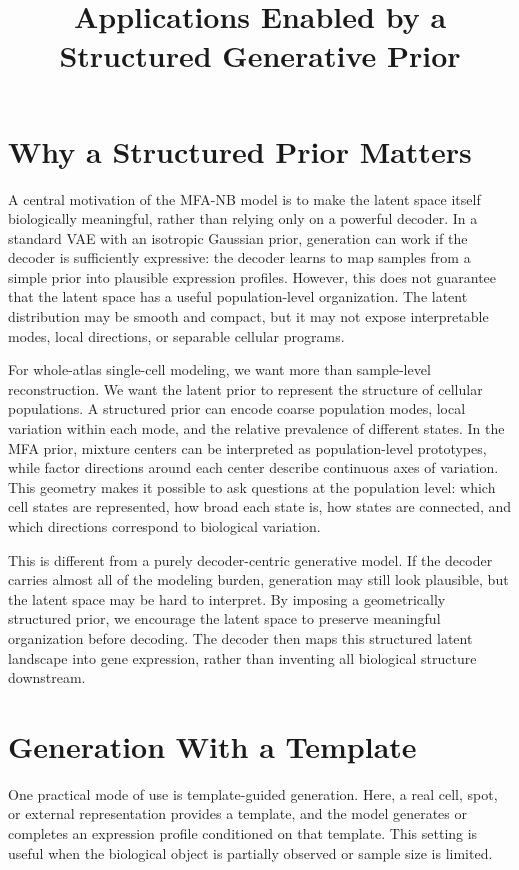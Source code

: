 \documentclass[11pt]{article}
\title{Applications Enabled by a Structured Generative Prior}
\author{}
\date{}
\begin{document}
\maketitle

\section{Why a Structured Prior Matters}

A central motivation of the MFA-NB model is to make the latent space itself biologically meaningful, rather than relying only on a powerful decoder. In a standard VAE with an isotropic Gaussian prior, generation can work if the decoder is sufficiently expressive: the decoder learns to map samples from a simple prior into plausible expression profiles. However, this does not guarantee that the latent space has a useful population-level organization. The latent distribution may be smooth and compact, but it may not expose interpretable modes, local directions, or separable cellular programs.

For whole-atlas single-cell modeling, we want more than sample-level reconstruction. We want the latent prior to represent the structure of cellular populations. A structured prior can encode coarse population modes, local variation within each mode, and the relative prevalence of different states. In the MFA prior, mixture centers can be interpreted as population-level prototypes, while factor directions around each center describe continuous axes of variation. This geometry makes it possible to ask questions at the population level: which cell states are represented, how broad each state is, how states are connected, and which directions correspond to biological variation.

This is different from a purely decoder-centric generative model. If the decoder carries almost all of the modeling burden, generation may still look plausible, but the latent space may be hard to interpret. By imposing a geometrically structured prior, we encourage the latent space to preserve meaningful organization before decoding. The decoder then maps this structured latent landscape into gene expression, rather than inventing all biological structure downstream.

\section{Generation With a Template}

One practical mode of use is template-guided generation. Here, a real cell, spot, or external representation provides a template, and the model generates or completes an expression profile conditioned on that template. This setting is useful when the biological object is partially observed or sample size is limited.
\end{document}
